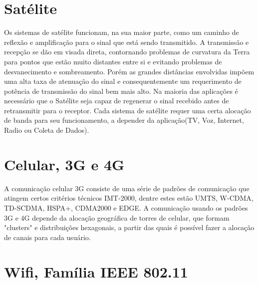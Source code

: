 \section{Satélite}
Os sistemas de satélite funcionam, na sua maior parte, como um caminho de reflexão e amplificação para o sinal que está sendo transmitido. A transmissão e recepção se dão em visada direta, contornando problemas de curvatura da Terra para pontos que estão muito distantes entre si e evitando problemas de desvanecimento e sombreamento. Porém as grandes distâncias envolvidas impõem uma alta taxa de atenuação do sinal e consequentemente um requerimento de potência de transmissão do sinal bem mais alto. Na maioria das aplicações é necessário que o Satélite seja capaz de regenerar o sinal recebido antes de retransmitir para o receptor. Cada sistema de satélite requer uma certa alocação de banda para seu funcionamento, a depender da aplicação(TV, Voz, Internet, Radio ou Coleta de Dados).  

\section{Celular, 3G e 4G}
A comunicação celular 3G consiste de uma série de padrões de comunicação que atingem certos critérios técnicos IMT-2000, dentre estes estão UMTS, W-CDMA, TD-SCDMA, HSPA+, CDMA2000 e EDGE. A comunicação usando os padrões 3G e 4G depende da alocação geográfica de torres de celular, que formam "clusters" e distribuições hexagonais, a partir das quais é possível fazer a alocação de canais para cada usuário. 

\section{Wifi, Família IEEE 802.11}
